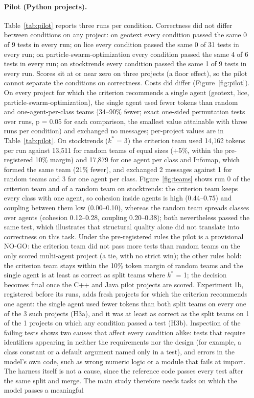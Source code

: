 \paragraph{Pilot (Python projects).} Table~\ref{tab:pilot} reports three runs per condition. Correctness did not differ between conditions on any project: on geotext every condition passed the same 0 of 9 tests in every run; on lice every condition passed the same 0 of 31 tests in every run; on particle-swarm-optimization every condition passed the same 4 of 6 tests in every run; on stocktrends every condition passed the same 1 of 9 tests in every run. Scores sit at or near zero on three projects (a floor effect), so the pilot cannot separate the conditions on correctness. Costs did differ (Figure~\ref{fig:pilot}). On every project for which the criterion recommends a single agent (geotext, lice, particle-swarm-optimization), the single agent used fewer tokens than random and one-agent-per-class teams (34--90\% fewer; exact one-sided permutation tests over runs, p = 0.05 for each comparison, the smallest value attainable with three runs per condition) and exchanged no messages; per-project values are in Table~\ref{tab:pilot}. On stocktrends ($k^\ast$ = 3) the criterion team used 14,162 tokens per run against 13,511 for random teams of equal sizes (+5\%, within the pre-registered 10\% margin) and 17,879 for one agent per class and Infomap, which formed the same team (21\% fewer), and exchanged 2 messages against 1 for random teams and 3 for one agent per class. Figure~\ref{fig:teams} shows run 0 of the criterion team and of a random team on stocktrends: the criterion team keeps every class with one agent, so cohesion inside agents is high (0.44--0.75) and coupling between them low (0.00--0.10), whereas the random team spreads classes over agents (cohesion 0.12--0.28, coupling 0.20--0.38); both nevertheless passed the same test, which illustrates that structural quality alone did not translate into correctness on this task. Under the pre-registered rules the pilot is a provisional NO-GO: the criterion team did not pass more tests than random teams on the only scored multi-agent project (a tie, with no strict win); the other rules hold: the criterion team stays within the 10\% token margin of random teams and the single agent is at least as correct as split teams where $k^\ast$ = 1; the decision becomes final once the C++ and Java pilot projects are scored. Experiment 1b, registered before its runs, adds fresh projects for which the criterion recommends one agent: the single agent used fewer tokens than both split teams on every one of the 3 such projects (H3a), and it was at least as correct as the split teams on 1 of the 1 projects on which any condition passed a test (H3b). Inspection of the failing tests shows two causes that affect every condition alike: tests that require identifiers appearing in neither the requirements nor the design (for example, a class constant or a default argument named only in a test), and errors in the model's own code, such as wrong numeric logic or a module that fails at import. The harness itself is not a cause, since the reference code passes every test after the same split and merge. The main study therefore needs tasks on which the model passes a meaningful 